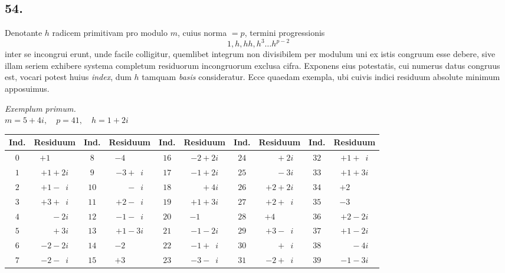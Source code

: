 \documentclass[twoside,12pt, showframe]{memoir}
\begin{document}
\subsection*{54.}
 
Denotante \(h\) radicem primitivam pro modulo \(m\), cuius norma \(=p\), termini progressionis
\[1, h, h h, h^{3} \ldots h^{p-2}\]
inter se incongrui erunt, unde facile colligitur, quemlibet integrum non divisibilem per modulum uni ex istis congruum esse debere, sive illam seriem exhibere systema completum residuorum incongruorum exclusa cifra. Exponens eius potestatis, cui numerus datus congruus est, vocari potest huius \textit{index}, dum \(h\) tamquam \textit{basis} consideratur. Ecce quaedam exempla, ubi cuivis indici residuum absolute minimum apposuimus.
\begin{center}
\textit{Exemplum primum.}\\
\(m=5+4 i, \quad p=41, \quad h=1+2 i\)\\
\begin{tabular}{c|c||c|c||c|c||c|c||c|c}
Ind. & Residuum & Ind. &Residuum & Ind. & Residuum & Ind. & Residuum & Ind. & Residuum \\
\hline
\(0\) & \(+1\phantom{\;+0i}\) & \(8\) & \(-4\phantom{\;+0i}\) & \(16 \)& \(-2+2 i\) & \(24\) & \(\phantom{+0}+2 i\) & \(32 \)& \(+1+\phantom{1}i\) \\
\(1\) & \(+1+2 i\) & \(9\) & \(-3+\phantom{1}i\) & \(17\) & \(-1+2 i\) & \(25\) & \(\phantom{+0}-3 i\) & \(33\) & \(+1+3 i\) \\
\(2\) & \(+1-\phantom{1}i\) & \(10\) & \(\phantom{+0}-\phantom{1}i\) & \(18\) & \(\phantom{+0}+4 i\) & \(26\) & \(+2+2 i\) & \(34\) & \(+2\phantom{\;+0i}\) \\
\(3\) & \(+3+\phantom{1}i\) & \(11\) & \(+2-\phantom{1}i\) & \(19\) & \(+1+3 i\) & \(27\) & \(+2+\phantom{1}i\) & \(35\) & \(-3\phantom{\;+0i}\)\\
\(4\) & \(\phantom{+0}-2 i\) & \(12\) & \(-1-\phantom{1}i\) & \(20\) & \(-1\phantom{\;+0i}\) & \(28\) & \(+4\phantom{\;+0i}\) & \(36\) & \(+2-2 i\) \\
\(5\) & \(\phantom{+0}+3 i\) & \(13\) & \(+1-3 i\) & \(21\) & \(-1-2 i\) & \(29\) & \(+3-\phantom{1}i\) & \(37\) & \(+1-2 i\) \\
\(6\) & \(-2-2 i\) & \(14\) & \(-2\phantom{\;+0i}\) & \(22\) & \(-1+\phantom{1}i\) & \(30\) & \(\phantom{+0}+\phantom{1}i\) & \(38\) & \(\phantom{+0}-4 i\) \\
\(7\) & \(-2-\phantom{1}i\) & \(15\) & \(+3\phantom{\;+0i}\) & \(23\) & \(-3-\phantom{1}i\) & \(31\) & \(-2+\phantom{1}i\) & \(39\) & \(-1-3 i\) \\
\end{tabular}
\end{center}\clearpage\noindent%
\end{document}
